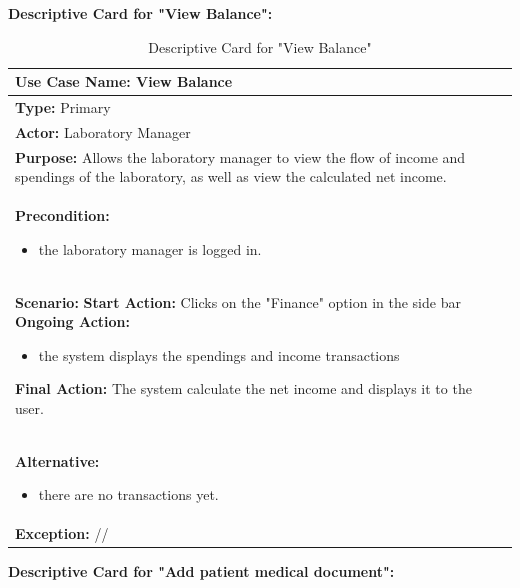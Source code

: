 \documentclass{article}
\begin{document}
\newpage

\textbf{Descriptive Card for "View Balance":}

\begin{table}[h]
\setlength{\tabcolsep}{10pt}
\renewcommand{\arraystretch}{1.5}
    \begin{tabular}{|p{\linewidth}|}
        \hline
        \textbf{Use Case Name:} View Balance\\ 
        \hline
        \textbf{Type:} Primary\\ 
        \hline
        \textbf{Actor:} Laboratory Manager\\ 
        \hline
        \textbf{Purpose:} Allows the laboratory manager to view the flow of income and spendings of the laboratory, as well as view the calculated net income.\\ 
        \hline
        \textbf{Precondition:}
        \begin{itemize}
            \item the laboratory manager is logged in.
        \end{itemize}\\ 
        \hline
        \textbf{Scenario:}
        \vspace{0.2cm}
        \newline
        \vspace{0.2cm}
        \textbf{Start Action:} Clicks on the "Finance" option in the side bar
        \newline
        \textbf{Ongoing Action:}  
        \begin{itemize}
            \item the system displays the spendings and income transactions 
        \end{itemize}
        \textbf{Final Action:} The system calculate the net income and displays it to the user. \\
        \hline
        \textbf{Alternative:} 
        \begin{itemize}
            \item there are no transactions yet.
        \end{itemize}\\ 
        \hline
        \textbf{Exception:} //\\ 
        \hline
    \end{tabular}
    \caption{Descriptive Card for "View Balance"}
    \label{tab:my-table}
\end{table}

\newpage
\textbf{Descriptive Card for "Add patient medical document":}
\end{document}
